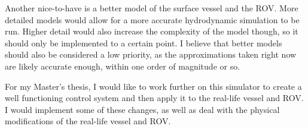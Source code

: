 Another nice-to-have is a better model of the surface vessel and the ROV. More detailed models would allow for a more accurate hydrodynamic simulation to be run. Higher detail would also increase the complexity of the model though, so it should only be implemented to a certain point. I believe that better models should also be considered a low priority, as the approximations taken right now are likely accurate enough, within one order of magnitude or so. 

For my Master's thesis, I would like to work further on this simulator to create a well functioning control system and then apply it to the real-life vessel and ROV. I would implement some of these changes, as well as deal with the physical modifications of the real-life vessel and ROV. 